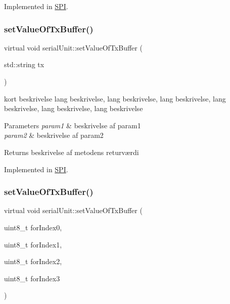 Implemented in \hyperlink{classSPI_ac50b3f5491e294aef6806f4e131cbd0e}{S\+PI}.

\mbox{\label{classserialUnit_a759db776a18c097ce85652d41d46b943}} 
\subsubsection{\texorpdfstring{set\+Value\+Of\+Tx\+Buffer()}{setValueOfTxBuffer()}\hspace{0.1cm}{\footnotesize\ttfamily [1/2]}}
{\footnotesize\ttfamily virtual void serial\+Unit\+::set\+Value\+Of\+Tx\+Buffer (\begin{DoxyParamCaption}\item[{std\+::string}]{tx }\end{DoxyParamCaption})\hspace{0.3cm}{\ttfamily [pure virtual]}}



kort beskrivelse lang beskrivelse, lang beskrivelse, lang beskrivelse, lang beskrivelse, lang beskrivelse, lang beskrivelse 


\begin{DoxyParams}{Parameters}
{\em param1} & beskrivelse af param1 \\
\hline
{\em param2} & beskrivelse af param2 \\
\hline
\end{DoxyParams}
\begin{DoxyReturn}{Returns}
beskrivelse af metodens returværdi 
\end{DoxyReturn}


Implemented in \hyperlink{classSPI_ad770b7e8e8ae678a2c3c5e2d2be6887a}{S\+PI}.

\mbox{\label{classserialUnit_a1e70c25a8057dd67330022a292144900}} 
\subsubsection{\texorpdfstring{set\+Value\+Of\+Tx\+Buffer()}{setValueOfTxBuffer()}\hspace{0.1cm}{\footnotesize\ttfamily [2/2]}}
{\footnotesize\ttfamily virtual void serial\+Unit\+::set\+Value\+Of\+Tx\+Buffer (\begin{DoxyParamCaption}\item[{uint8\+\_\+t}]{for\+Index0,  }\item[{uint8\+\_\+t}]{for\+Index1,  }\item[{uint8\+\_\+t}]{for\+Index2,  }\item[{uint8\+\_\+t}]{for\+Index3 }\end{DoxyParamCaption})\hspace{0.3cm}{\ttfamily [pure virtual]}}



